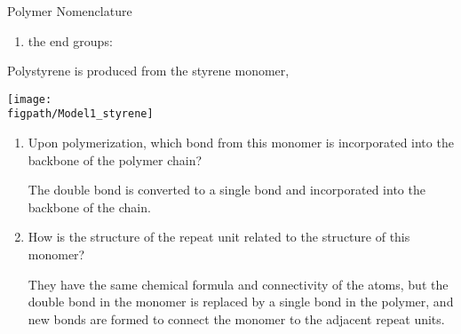 \begin{activity}{Polymer Nomenclature}
\begin{ctqs}
\begin{enumerate}
				\begin{solution}[0.5in]\studentdisplay{
					~
				}\end{solution}
			
			\item the end groups:
			
				\begin{solution}[0.5in]\studentdisplay{
					~
				}\end{solution}
			
			
		\end{enumerate}
		
	\question Polystyrene is produced from the styrene monomer,
	
		\centerline{\texttt{[image: \\figpath/Model1\_styrene]}}
	
		\begin{enumerate}
			\item Upon polymerization, which bond from this monomer is incorporated into the backbone of the polymer chain?
			
				\begin{solution}[0.5in]
				
					The double bond is converted to a single bond and incorporated into the backbone of the chain.
					
				\end{solution}
				
			\item How is the structure of the repeat unit related to the structure of this monomer?
			
				\begin{solution}[0.5in]
				
					They have the same chemical formula and connectivity of the atoms, but the double bond in the monomer is replaced by a single bond in the polymer, and new bonds are formed to connect the monomer to the adjacent repeat units.
					
				\end{solution}
				

\end{enumerate}
\end{ctqs}
\end{activity}
